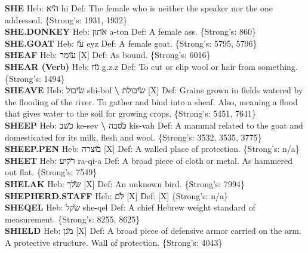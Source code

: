 {\textbf{SHE} Heb: {\large\H היא} hi Def: The female who is neither the speaker nor the one addressed. \{Strong's: 1931, 1932\}\hfill{}\\

\textbf{SHE.DONKEY} Heb: {\large\H אתון} a-ton Def: A female ass. \{Strong's: 860\}\hfill{}\\

\textbf{SHE.GOAT} Heb: {\large\H עז} eyz Def: A female goat. \{Strong's: 5795, 5796\}\hfill{}\\

\textbf{SHEAF} Heb: {\large\H עומר} {[}X{]} Def: As bound. \{Strong's: 6016\}\hfill{}\\

\textbf{SHEAR (Verb)} Heb: {\large\H גזז} g.z.z Def: To cut or clip wool or hair from something. \{Strong's: 1494\}\hfill{}\\

\textbf{SHEAVE} Heb: {\large\H שיבול} shi-bol \textbf{\textbackslash{}} {\large\H שיבולת} {[}X{]} Def: Grains grown in fields watered by the flooding of the river. To gather and bind into a sheaf. Also, meaning a flood that gives water to the soil for growing crops. \{Strong's: 5451, 7641\}\hfill{}\\

\textbf{SHEEP} Heb: {\large\H כשב} ke-sev \textbf{\textbackslash{}} {\large\H כסבה} kis-vah Def: A mammal related to the goat and domesticated for its milk, flesh and wool. \{Strong's: 3532, 3535, 3775\}\hfill{}\\

\textbf{SHEEP.PEN} Heb: {\large\H בוצרה} {[}X{]} Def: A walled place of protection. \{Strong's: n/a\}\hfill{}\\

\textbf{SHEET} Heb: {\large\H רקיע} ra-qi-a Def: A broad piece of cloth or metal. As hammered out flat. \{Strong's: 7549\}\hfill{}\\

\textbf{SHELAK} Heb: {\large\H שלך} {[}X{]} Def: An unknown bird. \{Strong's: 7994\}\hfill{}\\

\textbf{SHEPHERD.STAFF} Heb: {\large\H לם} {[}X{]} Def: {[}X{]} \{Strong's: n/a\}\hfill{}\\

\textbf{SHEQEL} Heb: {\large\H שקל} she-qel Def: A chief Hebrew weight standard of measurement. \{Strong's: 8255, 8625\}\hfill{}\\

\textbf{SHIELD} Heb: {\large\H מגן} {[}X{]} Def: A broad piece of defensive armor carried on the arm. A protective structure. Wall of protection. \{Strong's: 4043\}\hfill{}\\

}
